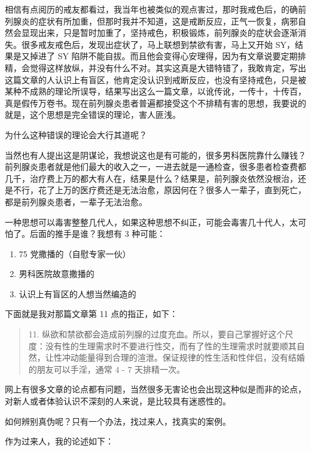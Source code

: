 \documentclass[fontset=founder]{ctexart}
\begin{document}
相信有点阅历的戒友都看过，我当年也被类似的观点害过，那时我戒色后，的确前列腺炎的症状有所加重，但那时我并不知道，这是戒断反应，正气一恢复，病邪自然会显现出来，只是暂时加重了，坚持戒色，积极锻炼，前列腺炎的症状会逐渐消失。很多戒友戒色后，发现出症状了，马上联想到禁欲有害，马上又开始 SY，结果是又掉进了 SY 陷阱不能自拔。而且他会变得心安理得，因为有文章说要定期排精，会觉得这样放纵，并没有什么不对。其实这真是大错特错了，我敢肯定，写出这篇文章的人认识上有盲区，他肯定没认识到戒断反应，也没有坚持戒色，只是被某种不成熟的理论所误导，结果写出这么一篇文章，以讹传讹，一传十，十传百，真是假传万卷书。现在前列腺炎患者普遍都接受这个不排精有害的思想，我要说的就是，这个思想是完全错误的理论，害人匪浅。

为什么这种错误的理论会大行其道呢？

当然也有人提出这是阴谋论，我想说这也是有可能的，很多男科医院靠什么赚钱？前列腺炎患者就是他们最大的收入之一，一进去就是一通检查，很多患者检查费都几千，治疗费上万的都大有人在，结果是什么？结果是，前列腺炎依然没根治，还是不行，花了上万的医疗费还是无法治愈，原因何在？很多人一辈子，直到死亡，都是前列腺炎患者，一辈子无法治愈。

一种思想可以毒害整整几代人，如果这种思想不纠正，可能会毒害几十代人，太可怕了。后面的推手是谁？我想有 3 种可能：

\begin{enumerate}
    \item 75 党撒播的（自慰专家一伙）
    \item 男科医院故意撒播的
    \item 认识上有盲区的人想当然编造的
\end{enumerate}

下面就是我对那篇文章第 11 点的指正，如下：

\begin{quote}
    11. 纵欲和禁欲都会造成前列腺的过度充血。所以，要自己掌握好这个尺度：没有性的生理需求时不要进行性交，而有了性的生理需求时就要顺其自然，让性冲动能量得到合理的渲泄。保证规律的性生活和性伴侣，没有结婚的朋友可以手淫，通常 4 - 7 天排精一次。
\end{quote}

网上有很多文章的论点都有问题，当然很多无害论也会出现这种似是而非的论点，对新人或者体验认识不深刻的人来说，是比较具有迷惑性的。

如何辨别真伪呢？只有一个办法，找过来人，找真实的案例。

作为过来人，我的论述如下：
\end{document}
